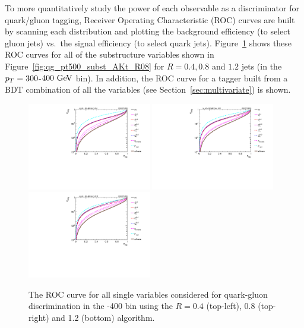 To more quantitatively study the power of each observable as a
discriminator for quark/gluon tagging, Receiver Operating Characteristic (ROC) curves are built by scanning each distribution
and plotting the background efficiency (to select gluon jets) vs.~the signal efficiency (to select quark jets). 
Figure~\ref{fig:qg_pt300_single} shows these ROC curves for all of the
substructure variables shown in 
Figure~\ref{fig:qg_pt500_subst_AKt_R08} for $R=0.4, 0.8$ and $1.2$ jets (in the $p_T=300$-$400\GeV$
bin). In addition, the ROC curve for a tagger built from a BDT
combination of all the variables (see Section~\ref{sec:multivariate}) is shown.
%
\begin{figure}
\centering
\includegraphics[width=0.48\textwidth]{./Figures/QGTagging/pT300/AKtR04/Rocs_1D_single.pdf}
\includegraphics[width=0.48\textwidth]{./Figures/QGTagging/pT300/AKtR08/Rocs_1D_single.pdf}
\includegraphics[width=0.48\textwidth]{./Figures/QGTagging/pT300/AKtR12/Rocs_1D_single.pdf}
\caption{The ROC curve for all single variables considered for
  quark-gluon discrimination in the -400 \GeV bin using the
  \antikt $R=0.4$ (top-left), 0.8 (top-right) and 1.2 (bottom) algorithm.%
}
\label{fig:qg_pt300_single}
\end{figure}
